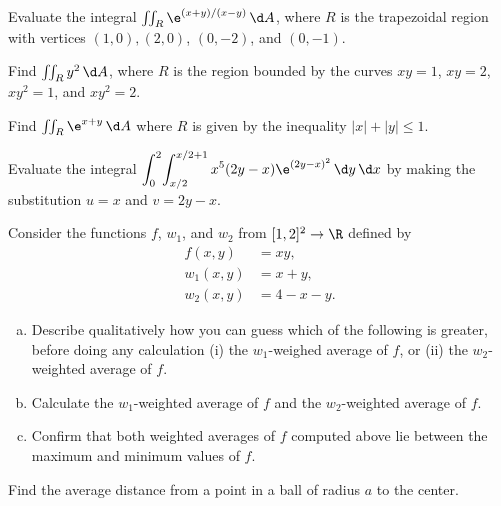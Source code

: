 \documentclass{watsonbook}
\begin{document}
\begin{aexercise}
  Evaluate the integral $\iint_R \e^{(x+y)/(x-y)} \, {\d}A$, where $R$ is
  the trapezoidal region with vertices $(1,0), (2,0)$, $(0,-2)$, and
  $(0,-1)$.
\end{aexercise}

\begin{aexercise}
  Find $\iint_R y^2 \, {\d}A$, where $R$ is the region bounded by the
  curves $xy = 1$, $xy = 2$, $xy^2 = 1$, and $xy^2 = 2$.
\end{aexercise}

\begin{aexercise}
  Find $\iint_R \e^{x+y} \, {\d}A$ where $R$ is given by the inequality
  $|x| + |y| \leq 1$.
\end{aexercise}

\begin{aexercise}
  Evaluate the integral
  $\displaystyle{\int_{0}^{2}\!\int_{x/2}^{x/2+1} x^5 (2y -
    x)\e^{(2y-x)^2} \,\d y\,\d x}$ by making the substitution $u = x$ and
  $v=2y-x$.
\end{aexercise}


\begin{aexercise}
  Consider the functions $f$, $w_1$, and $w_2$ from $[1,2]^2 \to \R$
  defined by
  \begin{align*}
    f(x,y) &= xy, \\
    w_1(x,y) &= x + y, \\
    w_2(x,y) &= 4-x-y. 
  \end{align*}
  \begin{enumerate}[(a),leftmargin=12pt,itemsep=6pt]
  \item \label{part:qual} Describe qualitatively how you can guess
  which of the following is greater, before doing any calculation
  (i) the $w_1$-weighed average of $f$, or (ii) the $w_2$-weighted
  average of $f$.
  
  \item \label{part:quant} Calculate the $w_1$-weighted average of
  $f$ and the $w_2$-weighted average of $f$.

  \item \label{ref:inequality} Confirm that both weighted averages
  of $f$ computed above lie between the maximum and minimum values of
  $f$.
\end{enumerate}
\end{aexercise}

\begin{aexercise}
  Find the average distance from a point in a ball of radius $a$ to
  the center. 
\end{aexercise}
\end{document}

